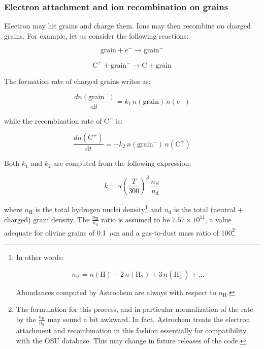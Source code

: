 \documentclass[a4paper,12pt]{article}
\newcommand{\conc}[1]{n(\mathrm{#1})}
\begin{document}
\subsubsection{Electron attachment and ion recombination on grains}
\label{sec:electr-attachm-ion}

Electron may hit grains and charge them. Ions may then recombine on
charged grains. For example, let us consider the following reactions:

\begin{equation}
  \mathrm{grain} + e^{-} \rightarrow \mathrm{grain}^{-}
\end{equation}

\begin{equation}
  \mathrm{C^{+}} + \mathrm{grain}^{-} \rightarrow \mathrm{C} + \mathrm{grain}
\end{equation}
 
The formation rate of charged grains writes as:

\begin{equation}
  \frac{d \conc{grain^{-}}}{\mathrm{d}t} = k_{1} \, \conc{grain} \, \conc{e^{-}}
\end{equation}

\noindent
while the recombination rate of $\mathrm{C^{+}}$ is:

\begin{equation}
  \frac{d \conc{C^{+}}}{\mathrm{d}t} = - k_{2} \, \conc{grain^{-}} \, \conc{C^{+}}
\end{equation}

Both $k_{1}$ and $k_{2}$ are computed from the following expression:

\begin{equation}
  k = \alpha \left( \frac{T}{300} \right)^\beta \, \frac{n_\mathrm{H}}{n_\mathrm{d}}
  \label{eq:grain-attach-neutralization}
\end{equation}

\noindent
where $n_\mathrm{H}$ is the total hydrogen nuclei density\footnote{In
  other words:

  \begin{equation}
    n_\mathrm{H} = \conc{H} + 2 \, \conc{H_{2}} + 3 \,
    \conc{H_{3}^{+}} + ...
  \end{equation}
  
  Abundances computed by Astrochem are always with respect to
  $n_\mathrm{H}$.}  and $n_\mathrm{d}$ is the total (neutral +
charged) grain density. The $\frac{n_\mathrm{H}}{n_\mathrm{d}}$ ratio
is assumed to be $7.57 \times 10^{11}$, a value adequate for olivine
grains of 0.1~$\mu$m and a gas-to-dust mass ratio of 100\footnote{The
  formulation for this process, and in particular normalization of the
  rate by the $\frac{n_\mathrm{H}}{n_\mathrm{d}}$ may sound a bit
  awkward. In fact, Astrochem treats the electron attachment and
  recombination in this fashion essentially for compatibility with the
  OSU database. This may change in future releases of the code.}
\end{document}
